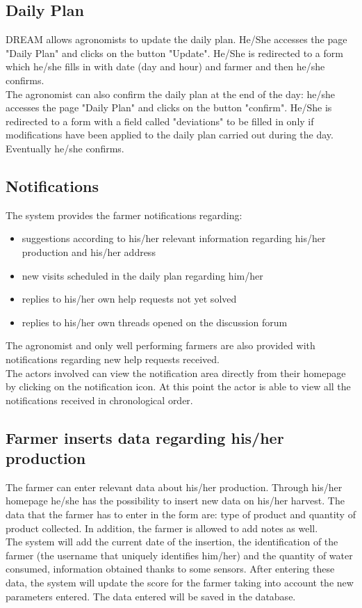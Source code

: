 \subsection{Daily Plan}
DREAM allows agronomists to update the daily plan. He/She accesses the page "Daily Plan" and clicks on the button "Update". He/She is redirected to a form which he/she fills in with date (day and hour) and farmer and then he/she confirms. \\
The agronomist can also confirm the daily plan at the end of the day: he/she accesses the page "Daily Plan" and clicks on the button "confirm". He/She is redirected to a form with a field called "deviations" to be filled in only if modifications have been applied to the daily plan carried out during the day. Eventually he/she confirms.

\subsection{Notifications}
The system provides the farmer notifications regarding: 
\begin{itemize}
    \item suggestions according to  his/her relevant information regarding his/her production and his/her address
    \item new visits scheduled in the daily plan regarding him/her
    \item replies to his/her own help requests not yet solved
    \item replies to his/her own threads opened on the discussion forum
\end{itemize}
The agronomist and only well performing farmers are also provided with notifications regarding new help requests received.\\

The actors involved can view the notification area directly from their homepage by clicking on the notification icon. At this point the actor is able to view all the notifications received in chronological order.

\subsection{Farmer inserts data regarding his/her production}
The farmer can enter relevant data about his/her production. Through his/her homepage he/she has the possibility to insert new data on his/her harvest.
The data that the farmer has to enter in the form are: type of product and quantity of product collected. In addition, the farmer is allowed to add notes as well.\\
The system will add the current date of the insertion, the identification of the farmer (the username that uniquely identifies him/her) and the quantity of water consumed, information obtained thanks to some sensors.
After entering these data, the system will update the score for the farmer taking into account the new parameters entered.
The data entered will be saved in the database.

